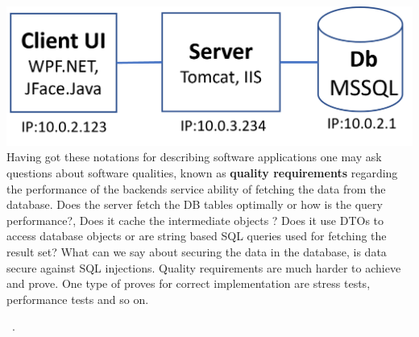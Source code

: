   
  \includegraphics[scale=0.5]{client-server.png}\\[\fill] 

Having got these notations for describing software applications one may ask questions about software qualities, known as \textbf{quality requirements} regarding the performance of the backends service ability of fetching the data from the database. Does the server fetch the DB tables optimally or how is the query performance?, Does it cache the intermediate objects ? Does it use DTOs to access database objects or are string based SQL queries used for fetching the result set? What can we say about securing the data in the database, is data secure against SQL injections.
Quality requirements are much harder to achieve and prove. One type of proves for correct implementation are stress tests, performance tests and so on. 

 ~\citep{lazypropagation2010,ambiguity2010}. \lipsum[2-10]

